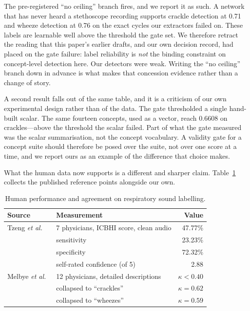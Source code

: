\documentclass[journal,onecolumn]{IEEEtran}
\begin{document}
The pre-registered ``no ceiling'' branch fires, and we report it as such. A network that
has never heard a stethoscope recording supports crackle detection at 0.71 and wheeze
detection at 0.76 on the exact cycles our extractors failed on. These labels are
learnable well above the threshold the gate set. We therefore retract the reading that
this paper's earlier drafts, and our own decision record, had placed on the gate
failure: label reliability is \emph{not} the binding constraint on concept-level
detection here. Our detectors were weak. Writing the ``no ceiling'' branch down in
advance is what makes that concession evidence rather than a change of story.

A second result falls out of the same table, and it is a criticism of our own
experimental design rather than of the data. The gate thresholded a single hand-built
scalar. The same fourteen concepts, used as a vector, reach 0.6608 on crackles---above
the threshold the scalar failed. Part of what the gate measured was the scalar
summarisation, not the concept vocabulary. A validity gate for a concept suite should
therefore be posed over the suite, not over one score at a time, and we report ours as
an example of the difference that choice makes.

What the human data now supports is a different and sharper claim.
Table~\ref{tab:human} collects the published reference points alongside our own.

\begin{table}[!t]
\centering
\caption{Human performance and agreement on respiratory sound labelling.}
\label{tab:human}
\begin{tabular}{llr}
\toprule
Source & Measurement & Value \\
\midrule
Tzeng \emph{et al.}~\cite{tzeng2025jmir} & 7 physicians, ICBHI score, clean audio & 47.77\% \\
                                          & \quad sensitivity & 23.23\% \\
                                          & \quad specificity & 72.32\% \\
                                          & \quad self-rated confidence (of 5) & 2.88 \\
\midrule
Melbye \emph{et al.}~\cite{melbye2016kappa} & 12 physicians, detailed descriptions & $\kappa < 0.40$ \\
                                          & \quad collapsed to ``crackles'' & $\kappa = 0.62$ \\
                                          & \quad collapsed to ``wheezes'' & $\kappa = 0.59$ \\
\bottomrule
\end{tabular}
\end{table}
\end{document}
